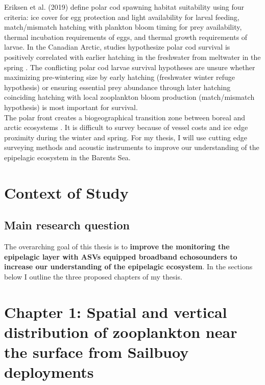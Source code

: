 \documentclass[a4paper, 12pt, Ariel]{article}
\begin{document}
Eriksen et al. (2019) define polar cod spawning habitat suitability using four criteria: ice cover for egg protection and light availability for larval feeding, match/mismatch hatching with plankton bloom timing for prey availability, thermal incubation requirements of eggs, and thermal growth requirements of larvae. In the Canadian Arctic, studies hypothesize polar cod survival is positively correlated with earlier hatching in the freshwater from meltwater in the spring \cite{Bouchard2011, Bouchard2015, Bouchard2017}. The conflicting polar cod larvae survival hypotheses are unsure whether maximizing pre-wintering size by early hatching (freshwater winter refuge hypothesis) \cite{Bouchard2017} or ensuring essential prey abundance through later hatching coinciding hatching with local zooplankton bloom production (match/mismatch hypothesis) \cite{Cushing1994, Eriksen2019} is most important for survival.\\

The polar front creates a biogeographical transition zone between boreal and arctic ecosystems \cite{Eriksen2015}. It is difficult to survey because of vessel costs and ice edge proximity during the winter and spring. For my thesis, I will use cutting edge surveying methods and acoustic instruments to improve our understanding of the epipelagic ecosystem in the Barents Sea.





\section{Context of Study}
\subsection{Main research question}
The overarching goal of this thesis is to \textbf{improve the monitoring the epipelagic layer with ASVs equipped broadband echosounders to increase our understanding of the epipelagic ecosystem}. In the sections below I outline the three proposed chapters of my thesis.

	
\section{Chapter 1: Spatial and vertical distribution of zooplankton near the surface from Sailbuoy deployments}
\end{document}
